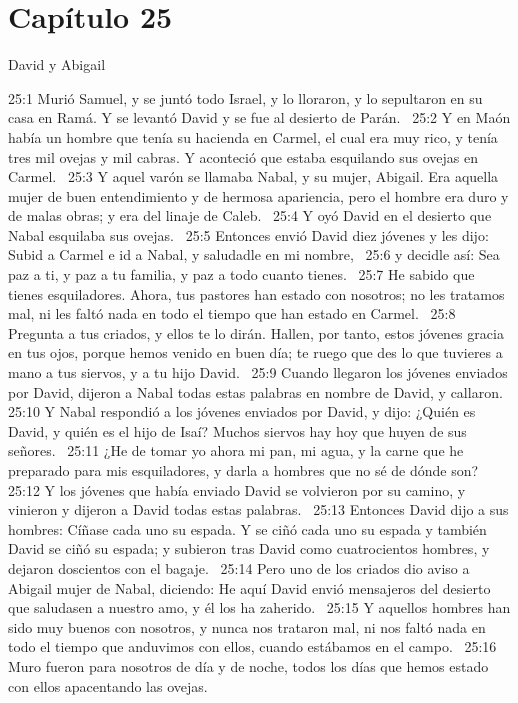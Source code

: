 \section*{Capítulo 25 }
David y Abigail  

25:1 Murió Samuel, y se juntó todo Israel, y lo lloraron, y lo sepultaron en su casa en Ramá. Y se levantó David y se fue al desierto de Parán.  
25:2 Y en Maón había un hombre que tenía su hacienda en Carmel, el cual era muy rico, y tenía tres mil ovejas y mil cabras. Y aconteció que estaba esquilando sus ovejas en Carmel.  
25:3 Y aquel varón se llamaba Nabal, y su mujer, Abigail. Era aquella mujer de buen entendimiento y de hermosa apariencia, pero el hombre era duro y de malas obras; y era del linaje de Caleb.  
25:4 Y oyó David en el desierto que Nabal esquilaba sus ovejas.  
25:5 Entonces envió David diez jóvenes y les dijo: Subid a Carmel e id a Nabal, y saludadle en mi nombre,  
25:6 y decidle así: Sea paz a ti, y paz a tu familia, y paz a todo cuanto tienes.  
25:7 He sabido que tienes esquiladores. Ahora, tus pastores han estado con nosotros; no les tratamos mal, ni les faltó nada en todo el tiempo que han estado en Carmel.  
25:8 Pregunta a tus criados, y ellos te lo dirán. Hallen, por tanto, estos jóvenes gracia en tus ojos, porque hemos venido en buen día; te ruego que des lo que tuvieres a mano a tus siervos, y a tu hijo David.  
25:9 Cuando llegaron los jóvenes enviados por David, dijeron a Nabal todas estas palabras en nombre de David, y callaron.  
25:10 Y Nabal respondió a los jóvenes enviados por David, y dijo: ¿Quién es David, y quién es el hijo de Isaí? Muchos siervos hay hoy que huyen de sus señores.  
25:11 ¿He de tomar yo ahora mi pan, mi agua, y la carne que he preparado para mis esquiladores, y darla a hombres que no sé de dónde son?  
25:12 Y los jóvenes que había enviado David se volvieron por su camino, y vinieron y dijeron a David todas estas palabras.  
25:13 Entonces David dijo a sus hombres: Cíñase cada uno su espada. Y se ciñó cada uno su espada y también David se ciñó su espada; y subieron tras David como cuatrocientos hombres, y dejaron doscientos con el bagaje.  
25:14 Pero uno de los criados dio aviso a Abigail mujer de Nabal, diciendo: He aquí David envió mensajeros del desierto que saludasen a nuestro amo, y él los ha zaherido.  
25:15 Y aquellos hombres han sido muy buenos con nosotros, y nunca nos trataron mal, ni nos faltó nada en todo el tiempo que anduvimos con ellos, cuando estábamos en el campo.  
25:16 Muro fueron para nosotros de día y de noche, todos los días que hemos estado con ellos apacentando las ovejas.  

